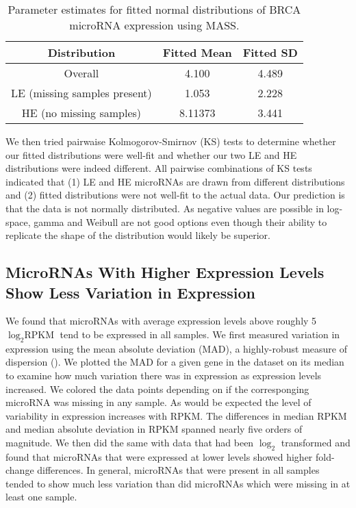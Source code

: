 \documentclass[12pt]{report}
\begin{document}
  \begin{table}[H]
  \centering
   \caption{Parameter estimates for fitted normal distributions of BRCA microRNA expression using MASS.}
   \begin{tabular}[]{| c | c | c |}
   \hline
    Distribution & Fitted Mean & Fitted SD\\
    \hline 
    Overall& 4.100 & 4.489\\
    \hline
    LE (missing samples present)& 1.053 & 2.228\\
    \hline
    HE (no missing samples) & 8.11373 & 3.441\\
    \hline
   \end{tabular}
  
   \label{fig::fitted_tabular}
  \end{table}

  We then tried pairwaise Kolmogorov-Smirnov (KS) tests to determine whether our fitted distributions were well-fit and whether our two LE and HE distributions were indeed different. All pairwise combinations of KS tests
  indicated that (1) LE and HE microRNAs are drawn from different distributions and (2) fitted distributions were not well-fit to the actual data. Our prediction is that the data is not normally distributed. As negative
  values are possible in log-space, gamma and Weibull are not good options even though their ability to replicate the shape of the distribution would likely be superior.


\subsection*{MicroRNAs With Higher Expression Levels Show Less Variation in Expression}
  We found that microRNAs with average expression levels above roughly 5 $\log_{2} \text{RPKM}$ tend to be expressed in all samples. We first measured variation in expression
  using the mean absolute deviation (MAD), a highly-robust measure of dispersion (). We plotted the MAD for a given gene in the dataset on its median to examine how much variation there was in
  expression as expression levels increased. We colored the data points depending on if the corresponging microRNA was missing in any sample.
  As would be expected the level of variability in expression increases with RPKM. The differences in median RPKM and median absolute deviation in RPKM spanned nearly five orders of magnitude. 
  We then did the same with data that had been $\log_{2}$ transformed
  and found that microRNAs that were expressed at lower levels showed higher fold-change differences. In general, microRNAs that were present in all samples
  tended to show much less variation than did microRNAs which were missing in at least one sample.
  
\end{document}
